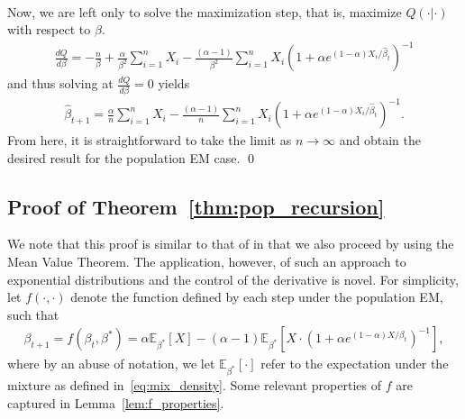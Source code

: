 \documentclass[runningheads]{llncs}
\begin{document}
\begin{subappendices}
\begin{align*}
\end{align*}
Now, we are left only to solve the maximization step, that is, maximize
$Q(\cdot|\cdot)$ with respect to $\beta$.
\begin{align*}
    \frac{dQ}{d\beta}
    = -\frac{n}{\beta}
    + \frac{\alpha}{\beta^2} \sum_{i=1}^n X_i
    -\frac{(\alpha - 1)}{\beta^2}
    \sum_{i=1}^n X_i(1+ \alpha e^{(1-\alpha)X_i / \hat{\beta}_t})^{-1}
\end{align*}
and thus solving at $\frac{dQ}{d\beta} = 0$ yields
\begin{align*}
    \hat{\beta}_{t+1}
  = \frac{\alpha}{n} \sum_{i=1}^n X_i
  - \frac{(\alpha - 1)}{n}
  \sum_{i=1}^n X_i (1+ \alpha e^{(1-\alpha)X_i / \hat{\beta}_t})^{-1} .
\end{align*}
From here, it is straightforward to take the limit as $n \rightarrow
\infty$ and obtain the desired result for the population EM case. \qed

\subsection*{Proof of Theorem~\ref{thm:pop_recursion}}
We note that this proof is similar to that of \cite[Theorem 1]{daskalakis2017ten}
in that we also proceed by using the Mean Value Theorem.
The application, however, of such an approach to exponential distributions and
the control of the derivative is novel.
For simplicity, let $f(\cdot, \cdot)$ denote the function defined by each step under the population EM, such that
\begin{align*}
\beta_{t+1}
  = f(\beta_t, \beta^*)
  = \alpha \mathbb{E}_{\beta^*}[X]
  - (\alpha - 1)\mathbb{E}_{\beta^*}[X \cdot (1+\alpha e^{(1-\alpha)X / \beta_t})^{-1}],
\end{align*}
where by an abuse of notation, we let $\mathbb{E}_{\beta^*}[\cdot]$ refer to the
expectation under the mixture as defined in~\eqref{eq:mix_density}. Some
relevant properties of $f$ are captured in Lemma~\ref{lem:f_properties}.


\end{subappendices}
\end{document}
